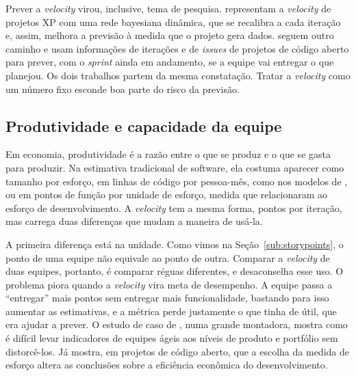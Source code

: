 Prever a \textit{velocity} virou, inclusive, tema de pesquisa.
 representam a \textit{velocity} de projetos XP com uma
rede bayesiana dinâmica, que se recalibra a cada iteração e, assim, melhora a
previsão à medida que o projeto gera dados. 
seguem outro caminho e usam informações de iterações e de \textit{issues} de
projetos de código aberto para prever, com o \textit{sprint} ainda em andamento,
se a equipe vai entregar o que planejou. Os dois trabalhos partem da mesma
constatação. Tratar a \textit{velocity} como um número fixo esconde boa parte do
risco da previsão.

\subsection{Produtividade e capacidade da equipe}
\label{sub:produtividade}

Em economia, produtividade é a razão entre o que se produz e o que se gasta para
produzir. Na estimativa tradicional de software, ela costuma aparecer como
tamanho por esforço, em linhas de código por pessoa-mês, como nos modelos de
, ou em pontos de função por unidade de esforço, medida
que  relacionaram ao esforço de desenvolvimento. A
\textit{velocity} tem a mesma forma, pontos por iteração, mas carrega duas
diferenças que mudam a maneira de usá-la.

A primeira diferença está na unidade. Como vimos na
Seção~\ref{sub:storypoints}, o ponto de uma equipe não equivale ao ponto de
outra. Comparar a \textit{velocity} de duas equipes, portanto, é comparar
réguas diferentes, e  desaconselha esse uso. O problema
piora quando a \textit{velocity} vira meta de desempenho. A equipe passa a
``entregar'' mais pontos sem entregar mais funcionalidade, bastando para isso
aumentar as estimativas, e a métrica perde justamente o que tinha de útil, que
era ajudar a prever. O estudo de caso de , numa grande
montadora, mostra como é difícil levar indicadores de equipes ágeis aos níveis
de produto e portfólio sem distorcê-los. Já  mostra, em
projetos de código aberto, que a escolha da medida de esforço altera as
conclusões sobre a eficiência econômica do desenvolvimento.

